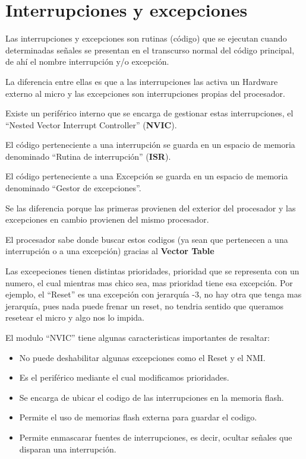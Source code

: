 \documentclass[a4paper,12pt]{report} %
\begin{document}
\section{Interrupciones y excepciones}

Las interrupciones y excepciones son rutinas (código) que se ejecutan cuando determinadas señales se presentan en el transcurso normal del código principal, de ahí el nombre interrupción y/o excepción.

La diferencia entre ellas es que a las interrupciones las activa un Hardware externo al micro y las excepciones son interrupciones propias del procesador.

Existe un periférico interno que se encarga de gestionar estas interrupciones, el ``Nested Vector Interrupt Controller'' (\textbf{NVIC}).

El código perteneciente a una interrupción se guarda en un espacio de memoria denominado ``Rutina de interrupción'' (\textbf{ISR}).

El código perteneciente a una Excepción se guarda en un espacio de memoria denominado ``Gestor de excepciones''.

Se las diferencia porque las primeras provienen del exterior del procesador y las excepciones en cambio provienen del mismo procesador. 

El procesador sabe donde buscar estos codigos (ya sean que pertenecen a una interrupción o a una excepción) gracias al \textbf{Vector Table}

Las excepeciones tienen distintas prioridades, prioridad que se representa con un numero, el cual mientras mas chico sea, mas prioridad tiene esa excepción. Por ejemplo, el ``Reset'' es una excepción con jerarquía -3, no hay otra que tenga mas jerarquía, pues nada puede frenar un reset, no tendria sentido que queramos resetear el micro y algo nos lo impida.
 
El modulo ``NVIC'' tiene algunas caracteristicas importantes de resaltar: 

\begin{itemize}
	\item No puede deshabilitar algunas excepciones como el Reset y el NMI.
	\item Es el periférico mediante el cual modificamos prioridades.
	\item Se encarga de ubicar el codigo de las interrupciones en la memoria flash.
	\item Permite el uso de memorias flash externa para guardar el codigo.
	\item Permite enmascarar fuentes de interrupciones, es decir, ocultar señales que disparan una interrupción.
\end{itemize}
\end{document}
